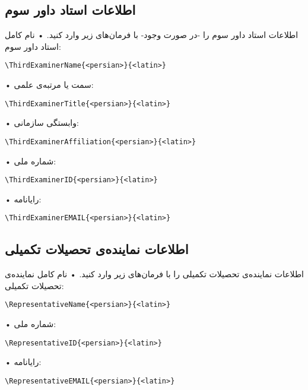 \documentclass[%
12pt,%
twoside, %
openany, %
notitlepage,%
fleqn,%
]{article}
\numberwithin{equation}{section} %
\begin{document}
\subsection{اطلاعات استاد داور سوم}
اطلاعات استاد داور سوم را -در صورت وجود- با فرمان‌های زیر وارد کنید\@. 
• نام کامل استاد داور سوم:
\begin{latin}\begin{verbatim}
\ThirdExaminerName{<persian>}{<latin>}
\end{verbatim} \end{latin}
• سمت یا مرتبه‌ی علمی:
\begin{latin}\begin{verbatim}
\ThirdExaminerTitle{<persian>}{<latin>}
\end{verbatim} \end{latin}
• وابستگی سازمانی:
\begin{latin}\begin{verbatim}
\ThirdExaminerAffiliation{<persian>}{<latin>}
\end{verbatim} \end{latin}
• شماره ملی:
\begin{latin}\begin{verbatim}
\ThirdExaminerID{<persian>}{<latin>}
\end{verbatim} \end{latin}
• رایانامه:
\begin{latin}\begin{verbatim}
\ThirdExaminerEMAIL{<persian>}{<latin>}
\end{verbatim} \end{latin}

\subsection{اطلاعات نماینده‌ی تحصیلات تکمیلی}
اطلاعات نماینده‌ی تحصیلات تکمیلی را با فرمان‌های زیر وارد کنید\@. 
• نام کامل نماینده‌ی تحصیلات تکمیلی:
\begin{latin}\begin{verbatim}
\RepresentativeName{<persian>}{<latin>}
\end{verbatim} \end{latin}
• شماره ملی:
\begin{latin}\begin{verbatim}
\RepresentativeID{<persian>}{<latin>}
\end{verbatim} \end{latin}
• رایانامه:
\begin{latin}\begin{verbatim}
\RepresentativeEMAIL{<persian>}{<latin>}
\end{verbatim} \end{latin}
\end{document}
